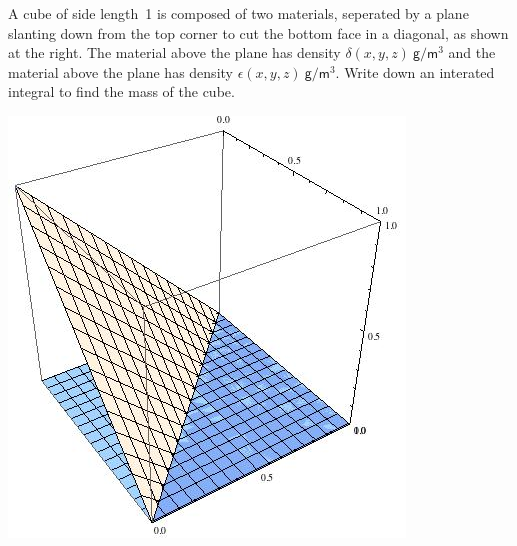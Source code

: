 \documentclass[12pt,addpoints]{exam}
\begin{document}
\begin{questions}
\begin{multicols}{2}
\question[25] A cube of side length~1 is composed
of two materials, seperated by a plane slanting down
from the top corner to cut the bottom face in a diagonal,
as shown at the right. The material above the plane
has density $\delta\left(x,y,z\right)~\mathsf{g}/\mathsf{m}^3$
and the material
above the plane has density
$\epsilon\left(x,y,z\right)~\mathsf{g}/\mathsf{m}^3$.
Write down an interated integral to find the mass of the cube.
\begin{center}\includegraphics[scale=.5]{BoxPlane}\end{center}
\end{multicols}
\ifprintanswers\else\newpage\fi

\question[25] 
\begin{parts}

\end{parts}
\end{questions}
\end{document}
